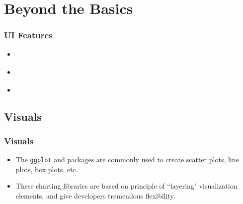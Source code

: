 \documentclass[
	11pt, %
]{beamer}
\begin{document}


\section{Beyond the Basics}

%	
%	


\begin{frame}
	\frametitle{UI Features}
	
	\begin{itemize}
		\item\href{https://shiny.rstudio.com/gallery/widget-gallery.html}{\color{blue}{Widgets}}
		\item \href{http://shinyapps.dreamrs.fr/shinyWidgets/}{\color{blue}{Even more widgets}}
		\item \href{https://shiny.rstudio.com/articles/progress.html}{\color{blue}{Progress bars}}
		\end{itemize}
\end{frame}




\subsection{Visuals}

\begin{frame}
	\frametitle{Visuals}
	
	\begin{itemize}
		\item The \texttt{ggplot} and \href{https://plotly.com/r/}{} packages are commonly used to create scatter plots, line plots, box plots, etc.
		\item These charting libraries are based on principle of ``layering" visualization elements, and give developers tremendous flexibility.
	\end{itemize}
\end{frame}
\end{document}
